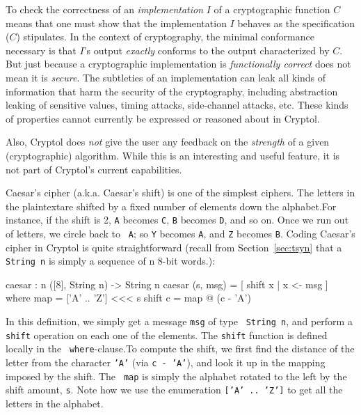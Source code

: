 To check the correctness of an \emph{implementation} $I$ of a
cryptographic function $C$ means that one must show that the
implementation $I$ behaves as the specification ($C$) stipulates.  In
the context of cryptography, the minimal conformance necessary is
that $I$'s output \emph{exactly} conforms to the output characterized
by $C$.  But just because a cryptographic implementation is
\emph{functionally correct} does not mean it is \emph{secure}.  The
subtleties of an implementation can leak all kinds of information that
harm the security of the cryptography, including abstraction leaking
of sensitive values, timing attacks, side-channel attacks, etc.  These
kinds of properties cannot currently be expressed or reasoned about in
Cryptol.

Also, Cryptol does \emph{not} give the user any feedback on the
\emph{strength} of a given (cryptographic) algorithm.  While this is
an interesting and useful feature, it is not part of Cryptol's current
capabilities.


Caesar's cipher (a.k.a. Caesar's shift) is one of the simplest
ciphers.  The letters in the plaintext\indPlaintext are shifted by a
fixed number of elements down the alphabet.\indCaesarscipher For
instance, if the shift is 2, {\tt A} becomes {\tt C}, {\tt B} becomes
{\tt D}, and so on. Once we run out of letters, we circle back to {\tt
  A}; so {\tt Y} becomes {\tt A}, and {\tt Z} becomes {\tt B}.  Coding
Caesar's cipher in Cryptol is quite straightforward (recall from
Section~\ref{sec:tsyn} that a {\tt String n} is simply a sequence of n
8-bit words.):\indTSString
\begin{code}
  caesar : {n} ([8], String n) -> String n
  caesar (s, msg) = [ shift x | x <- msg ]
        where map     = ['A' .. 'Z'] <<< s
              shift c = map @ (c - 'A')
\end{code}
In this definition, we simply get a message {\tt msg} of type {\tt
  String n}, and perform a {\tt shift} operation on each one of the
elements.  The {\tt shift} function is defined locally in the {\tt
  where}-clause.\indWhere To compute the shift, we first find the
distance of the letter from the character {\tt 'A'} (via {\tt c -
  'A'}), and look it up in the mapping imposed by the shift. The {\tt
  map} is simply the alphabet rotated to the left by the shift amount,
{\tt s}. Note how we use the enumeration {\tt ['A' .. 'Z']} to get all
the letters in the alphabet.\indEnum

